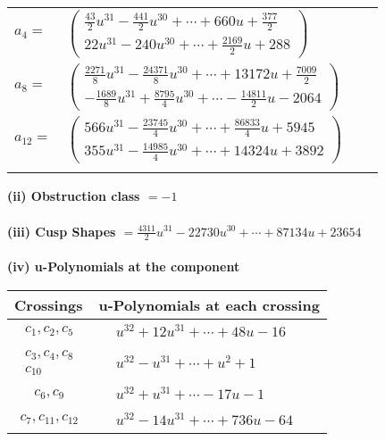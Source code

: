 \documentclass[1p]{elsarticle_modified}
\theoremstyle{definition}
\begin{document}
\begin{tabular}{m{7pt} m{180pt} m{7pt} m{180pt} }
\flushright $a_{4}=$&$\begin{pmatrix}\frac{43}{2} u^{31}-\frac{441}{2} u^{30}+\cdots+660 u+\frac{377}{2}\\22 u^{31}-240 u^{30}+\cdots+\frac{2169}{2} u+288\end{pmatrix}$ \\
\flushright $a_{8}=$&$\begin{pmatrix}\frac{2271}{8} u^{31}-\frac{24371}{8} u^{30}+\cdots+13172 u+\frac{7009}{2}\\-\frac{1689}{8} u^{31}+\frac{8795}{4} u^{30}+\cdots-\frac{14811}{2} u-2064\end{pmatrix}$ \\
\flushright $a_{12}=$&$\begin{pmatrix}566 u^{31}-\frac{23745}{4} u^{30}+\cdots+\frac{86833}{4} u+5945\\355 u^{31}-\frac{14985}{4} u^{30}+\cdots+14324 u+3892\end{pmatrix}$\\&\end{tabular}
\flushleft \textbf{(ii) Obstruction class $= -1$}\\~\\
\flushleft \textbf{(iii) Cusp Shapes $= \frac{4311}{2} u^{31}-22730 u^{30}+\cdots+87134 u+23654$}\\~\\
\newpage\renewcommand{\arraystretch}{1}
\flushleft \textbf{(iv) u-Polynomials at the component}\newline \\
\begin{tabular}{m{50pt}|m{274pt}}
Crossings & \hspace{64pt}u-Polynomials at each crossing \\
\hline $$\begin{aligned}c_{1},c_{2},c_{5}\end{aligned}$$&$\begin{aligned}
&u^{32}+12 u^{31}+\cdots+48 u-16
\end{aligned}$\\
\hline $$\begin{aligned}c_{3},c_{4},c_{8}\\c_{10}\end{aligned}$$&$\begin{aligned}
&u^{32}- u^{31}+\cdots+u^2+1
\end{aligned}$\\
\hline $$\begin{aligned}c_{6},c_{9}\end{aligned}$$&$\begin{aligned}
&u^{32}+u^{31}+\cdots-17 u-1
\end{aligned}$\\
\hline $$\begin{aligned}c_{7},c_{11},c_{12}\end{aligned}$$&$\begin{aligned}
&u^{32}-14 u^{31}+\cdots+736 u-64
\end{aligned}$\\
\hline
\end{tabular}\\~\\
\end{document}
